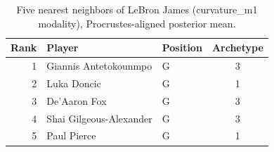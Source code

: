 \begin{table}[htbp]
  \centering\small
  \begin{tabular}{rllc}
    \toprule
    Rank & Player & Position & Archetype \\
    \midrule
    1 & Giannis Antetokounmpo & G & 3 \\
    2 & Luka Doncic & G & 1 \\
    3 & De'Aaron Fox & G & 3 \\
    4 & Shai Gilgeous-Alexander & G & 3 \\
    5 & Paul Pierce & G & 1 \\
    \bottomrule
  \end{tabular}
  \caption{Five nearest neighbors of LeBron James (curvature_m1 modality), Procrustes-aligned posterior mean.}
  \label{tab:LeBron_James_neighbors_curvature_m1}
\end{table}

